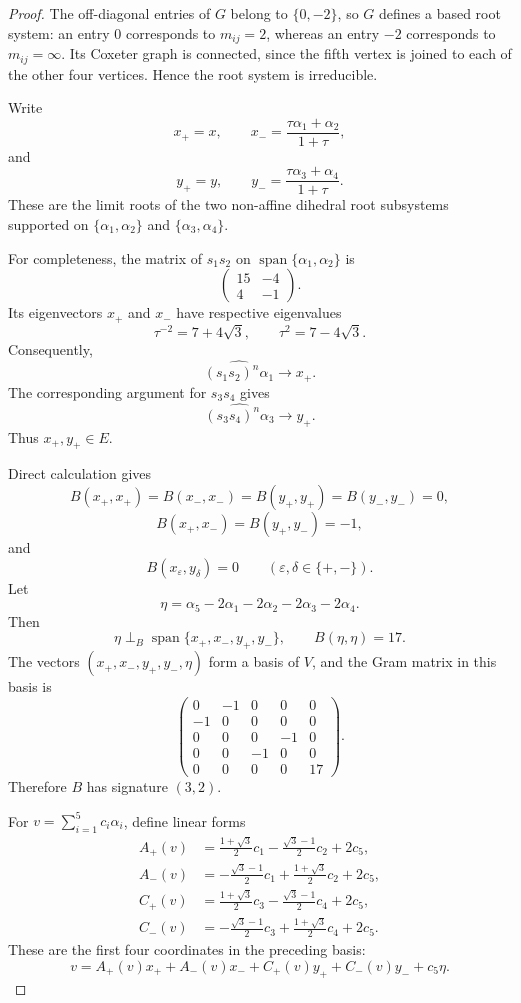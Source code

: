 \documentclass[11pt,reqno]{amsart}
\theoremstyle{plain}
\theoremstyle{definition}
\theoremstyle{remark}
\numberwithin{equation}{section}
\begin{document}
\begin{proof}
The off-diagonal entries of $G$ belong to $\{0,-2\}$, so $G$
defines a based root system: an entry $0$ corresponds to
$m_{ij}=2$, whereas an entry $-2$ corresponds to $m_{ij}=\infty$.
Its Coxeter graph is connected, since the fifth vertex is
joined to each of the other four vertices. Hence the root
system is irreducible.

Write
\[
x_+=x,
\qquad
x_-=\frac{\tau\alpha_1+\alpha_2}{1+\tau},
\]
and
\[
y_+=y,
\qquad
y_-=\frac{\tau\alpha_3+\alpha_4}{1+\tau}.
\]
These are the limit roots of the two non-affine dihedral
root subsystems supported on
$\{\alpha_1,\alpha_2\}$ and $\{\alpha_3,\alpha_4\}$.

For completeness, the matrix of $s_1s_2$ on
$\operatorname{span}\{\alpha_1,\alpha_2\}$ is
\[
\begin{pmatrix}
15&-4\\
4&-1
\end{pmatrix}.
\]
Its eigenvectors $x_+$ and $x_-$ have respective eigenvalues
\[
\tau^{-2}=7+4\sqrt{3},
\qquad
\tau^2=7-4\sqrt{3}.
\]
Consequently,
\[
\widehat{(s_1s_2)^n\alpha_1}\longrightarrow x_+.
\]
The corresponding argument for $s_3s_4$ gives
\[
\widehat{(s_3s_4)^n\alpha_3}\longrightarrow y_+.
\]
Thus $x_+,y_+\in E$.

Direct calculation gives
\[
B(x_+,x_+)=B(x_-,x_-)
=B(y_+,y_+)=B(y_-,y_-)=0,
\]
\[
B(x_+,x_-)=B(y_+,y_-)=-1,
\]
and
\[
B(x_\varepsilon,y_\delta)=0
\qquad
(\varepsilon,\delta\in\{+,-\}).
\]
Let
\[
\eta=\alpha_5-2\alpha_1-2\alpha_2-2\alpha_3-2\alpha_4.
\]
Then
\[
\eta\perp_B
\operatorname{span}\{x_+,x_-,y_+,y_-\},
\qquad
B(\eta,\eta)=17.
\]
The vectors $(x_+,x_-,y_+,y_-,\eta)$ form a basis of $V$,
and the Gram matrix in this basis is
\[
\begin{pmatrix}
0&-1&0&0&0\\
-1&0&0&0&0\\
0&0&0&-1&0\\
0&0&-1&0&0\\
0&0&0&0&17
\end{pmatrix}.
\]
Therefore $B$ has signature $(3,2)$.

For $v=\sum_{i=1}^{5}c_i\alpha_i$, define linear forms
\[
\begin{aligned}
A_+(v)
&=\frac{1+\sqrt{3}}{2}c_1
  -\frac{\sqrt{3}-1}{2}c_2+2c_5,\\
A_-(v)
&=-\frac{\sqrt{3}-1}{2}c_1
  +\frac{1+\sqrt{3}}{2}c_2+2c_5,\\
C_+(v)
&=\frac{1+\sqrt{3}}{2}c_3
  -\frac{\sqrt{3}-1}{2}c_4+2c_5,\\
C_-(v)
&=-\frac{\sqrt{3}-1}{2}c_3
  +\frac{1+\sqrt{3}}{2}c_4+2c_5.
\end{aligned}
\]
These are the first four coordinates in the preceding basis:
\[
v=
A_+(v)x_++A_-(v)x_-
+C_+(v)y_++C_-(v)y_-+c_5\eta.
\]


\end{proof}
\end{document}
